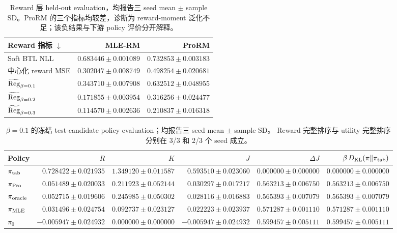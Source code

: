 \begin{table}[tbp]
\centering
\small
\setlength{\tabcolsep}{5pt}
\begin{tabular}{lrr}
\toprule
Reward 指标 $\downarrow$ & MLE-RM & ProRM \\
\midrule
Soft BTL NLL & $0.683446 \pm 0.001089$ & $0.732853 \pm 0.003183$ \\
中心化 reward MSE & $0.302047 \pm 0.008749$ & $0.498254 \pm 0.020681$ \\
$\widetilde{\operatorname{Reg}}_{\beta=0.1}$ & $0.343710 \pm 0.007908$ & $0.632512 \pm 0.048955$ \\
$\widetilde{\operatorname{Reg}}_{\beta=0.2}$ & $0.171855 \pm 0.003954$ & $0.316256 \pm 0.024477$ \\
$\widetilde{\operatorname{Reg}}_{\beta=0.3}$ & $0.114570 \pm 0.002636$ & $0.210837 \pm 0.016318$ \\
\bottomrule
\end{tabular}
\caption{Reward 层 held-out evaluation，均报告三 seed mean $\pm$ sample SD。ProRM 的三个指标均较差，诊断为 reward-moment 泛化不足；该负结果与下游 policy 评价分开解释。}
\label{tab:main-reward}
\end{table}

\begin{table}[tbp]
\centering
\scriptsize
\setlength{\tabcolsep}{3.0pt}
\begin{tabular}{lrrrrr}
\toprule
Policy & $R$ & $K$ & $J$ & $\Delta J$ & $\beta\,D_{\mathrm{KL}}(\pi\|\pi_{\rm tab})$ \\
\midrule
$\pi_{\rm tab}$ & $0.728422 \pm 0.021935$ & $1.349120 \pm 0.011587$ & $0.593510 \pm 0.023060$ & $0.000000 \pm 0.000000$ & $0.000000 \pm 0.000000$ \\
$\pi_{\rm Pro}$ & $0.051489 \pm 0.020033$ & $0.211923 \pm 0.052144$ & $0.030297 \pm 0.017217$ & $0.563213 \pm 0.006750$ & $0.563213 \pm 0.006750$ \\
$\pi_{\rm oracle}$ & $0.052715 \pm 0.019606$ & $0.245985 \pm 0.050302$ & $0.028116 \pm 0.016883$ & $0.565393 \pm 0.007079$ & $0.565393 \pm 0.007079$ \\
$\pi_{\rm MLE}$ & $0.031496 \pm 0.024754$ & $0.092737 \pm 0.023127$ & $0.022223 \pm 0.023937$ & $0.571287 \pm 0.001110$ & $0.571287 \pm 0.001110$ \\
$\pi_0$ & $-0.005947 \pm 0.024932$ & $0.000000 \pm 0.000000$ & $-0.005947 \pm 0.024932$ & $0.599457 \pm 0.005111$ & $0.599457 \pm 0.005111$ \\
\bottomrule
\end{tabular}
\caption{$\beta=0.1$ 的冻结 test-candidate policy evaluation；均报告三 seed mean $\pm$ sample SD。 Reward 完整排序与 utility 完整排序分别在 3/3 和 2/3 个 seed 成立。}
\label{tab:main-policy-01}
\end{table}

